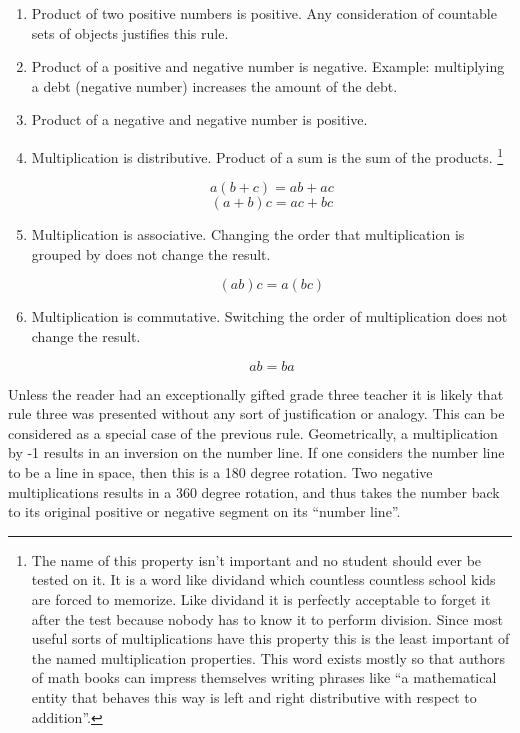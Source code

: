 \begin{enumerate}
\item Product of two positive numbers is positive.  Any consideration of countable sets of objects justifies this rule.

\item Product of a positive and negative number is negative.  Example: multiplying a debt (negative number) increases the amount of the debt.

\item Product of a negative and negative number is positive.

\item Multiplication is distributive.  Product of a sum is the sum of the products.
\footnote{The name of this property isn't important and no student should ever be tested on it.  It is a word like
dividand which countless countless school kids are forced to memorize.  Like dividand it is perfectly
acceptable to forget it after the test because nobody has to know it to perform division.
Since most useful sorts of multiplications have this property this is the least important
of the named multiplication properties.  This word exists mostly so that authors of math books can impress themselves writing phrases like ``a mathematical entity that behaves this way is 
left and right distributive with respect to addition''.
}

\[
a (b + c) = a b + a c
\]
\[
(a + b) c = a c + b c
\]

\item Multiplication is associative.  Changing the order that multiplication is grouped by does not change the result.

\[
(a b) c = a (b c)
\]

\item Multiplication is commutative.  Switching the order of multiplication does not change the result.

\[
a b = b a
\]

\end{enumerate}

Unless the reader had an exceptionally gifted grade three teacher it is likely that rule three was presented without any sort of justification or analogy.  This can be considered as a special case of the previous rule.  Geometrically, a multiplication by -1 results in an inversion on the number line.  If one considers the number line to be a line in space, then this is a 180 degree rotation.  Two negative multiplications results in a 360 degree rotation, and thus takes the number back to its original positive or negative segment on its ``number line''.

